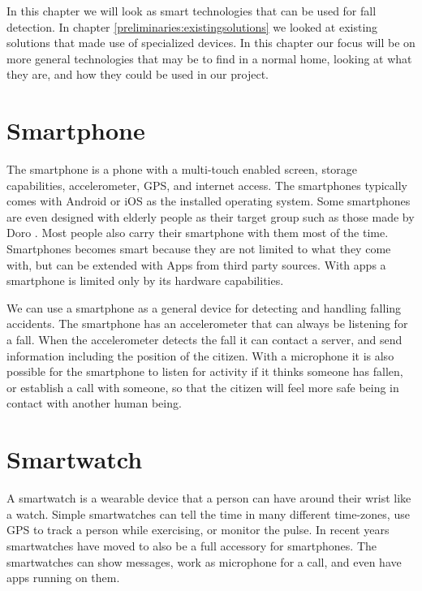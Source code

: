 \label{chap:technologies}
In this chapter we will look as smart technologies that can be used for fall detection. In chapter \ref{preliminaries:existingsolutions} we looked at existing solutions that made use of specialized devices. In this chapter our focus will be on more general technologies that may be to find in a normal home, looking at what they are, and how they could be used in our project.


\section*{Smartphone} \label{technologies:smartphone}
The smartphone is a phone with a multi-touch enabled screen, storage capabilities, accelerometer, GPS, and internet access. The smartphones typically comes with Android or iOS as the installed operating system. Some smartphones are even designed with elderly people as their target group such as those made by Doro \cite{doro}. Most people also carry their smartphone with them most of the time.
Smartphones becomes smart because they are not limited to what they come with, but can be extended with Apps from third party sources. With apps a smartphone is limited only by its hardware capabilities.

We can use a smartphone as a general device for detecting and handling falling accidents. The smartphone has an accelerometer that can always be listening for a fall. When the accelerometer detects the fall it can contact a server, and send information including the position of the citizen. With a microphone it is also possible for the smartphone to listen for activity if it thinks someone has fallen, or establish a call with someone, so that the citizen will feel more safe being in contact with another human being.

\section*{Smartwatch}
A smartwatch is a wearable device that a person can have around their wrist like a watch. Simple smartwatches can tell the time in many different time-zones, use GPS to track a person while exercising, or monitor the pulse.
In recent years smartwatches have moved to also be a full accessory for smartphones. The smartwatches can show messages, work as microphone for a call, and even have apps running on them.

